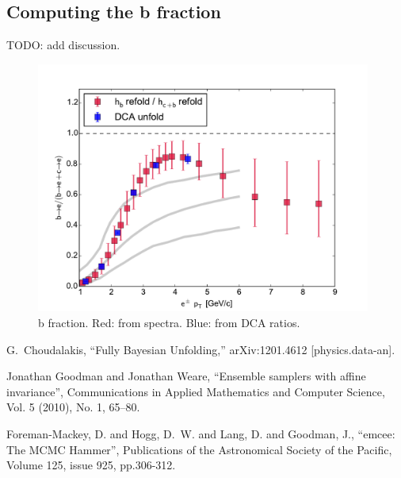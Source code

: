 \documentclass[12pt]{article}
\begin{document}
\subsection{Computing the b fraction}
TODO: add discussion.
\begin{figure}[htb]
  \begin{center}
    \includegraphics[width=0.98\textwidth]{AuAu200MB/2/bfrac}
  \end{center}
  \caption{b fraction. Red: from spectra. Blue: from DCA ratios.}
  \label{fig:dca-refold}
\end{figure}


\begin{thebibliography}{99}
  G.~Choudalakis,
  ``Fully Bayesian Unfolding,''
  arXiv:1201.4612 [physics.data-an].

  Jonathan Goodman and Jonathan Weare,
  ``Ensemble samplers with affine invariance'',
  Communications in Applied Mathematics and Computer Science,
  Vol. 5 (2010), No. 1, 65–80.

Foreman-Mackey, D. and Hogg, D.~W. and {Lang}, D. and {Goodman}, J.,
``emcee: The MCMC Hammer'',
Publications of the Astronomical Society of the Pacific, Volume 125, issue 925, pp.306-312.


\end{thebibliography}
\end{document}
